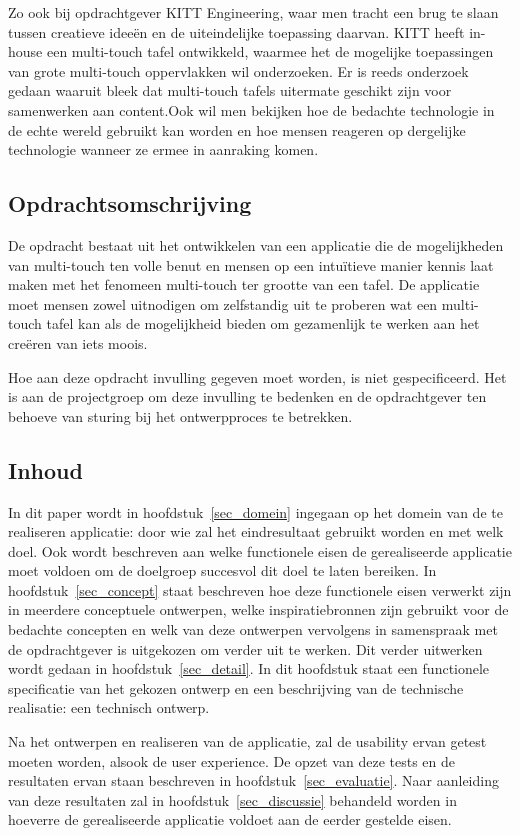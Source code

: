 \documentclass{acm}
\begin{document}
Zo ook bij opdrachtgever KITT Engineering, waar men tracht een brug te slaan tussen creatieve idee\"en en de uiteindelijke toepassing daarvan. KITT heeft in-house een multi-touch tafel ontwikkeld, waarmee het de mogelijke toepassingen van grote multi-touch oppervlakken wil onderzoeken. Er is reeds onderzoek gedaan waaruit bleek dat multi-touch tafels uitermate geschikt zijn voor samenwerken aan content.\cite{Shen}\cite{Ryall}Ook wil men bekijken hoe de bedachte technologie in de echte wereld gebruikt kan worden en hoe mensen reageren op dergelijke technologie wanneer ze ermee in aanraking komen.

\subsection{Opdrachtsomschrijving}
De opdracht bestaat uit het ontwikkelen van een applicatie die de mogelijkheden van multi-touch ten volle benut en mensen op een intu\"itieve manier kennis laat maken met het fenomeen multi-touch ter grootte van een tafel. De applicatie moet mensen zowel uitnodigen om zelfstandig uit te proberen wat een multi-touch tafel kan als de mogelijkheid bieden om gezamenlijk te werken aan het cre\"eren van iets moois.

Hoe aan deze opdracht invulling gegeven moet worden, is niet gespecificeerd. Het is aan de projectgroep om deze invulling te bedenken en de opdrachtgever ten behoeve van sturing bij het ontwerpproces te betrekken.

\subsection{Inhoud}
In dit paper wordt in hoofdstuk~\ref{sec_domein} ingegaan op het domein van de te realiseren applicatie: door wie zal het eindresultaat gebruikt worden en met welk doel. Ook wordt beschreven aan welke functionele eisen de gerealiseerde applicatie moet voldoen om de doelgroep succesvol dit doel te laten bereiken. In hoofdstuk~\ref{sec_concept} staat beschreven hoe deze functionele eisen verwerkt zijn in meerdere conceptuele ontwerpen, welke inspiratiebronnen zijn gebruikt voor de bedachte concepten en welk van deze ontwerpen vervolgens in samenspraak met de opdrachtgever is uitgekozen om verder uit te werken. Dit verder uitwerken wordt gedaan in hoofdstuk~\ref{sec_detail}. In dit hoofdstuk staat een functionele specificatie van het gekozen ontwerp en een beschrijving van de technische realisatie: een technisch ontwerp.

Na het ontwerpen en realiseren van de applicatie, zal de usability ervan getest moeten worden, alsook de user experience. De opzet van deze tests en de resultaten ervan staan beschreven in hoofdstuk~\ref{sec_evaluatie}. Naar aanleiding van deze resultaten zal in hoofdstuk~\ref{sec_discussie} behandeld worden in hoeverre de gerealiseerde applicatie voldoet aan de eerder gestelde eisen.
\end{document}
